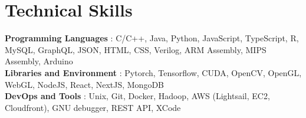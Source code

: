 \documentclass[letterpaper,11pt]{article}
\makeatletter
\newcommand{\sectionspace}{
\vspace{-20pt}
}
\newcommand{\subheadingtitlevspace}{
\vspace{-3pt}
}
\newcommand{\titleItem}[1]{
  \textbf{#1}
}
\newcommand{\resumeSubheading}[4]{
   \item
     \begin{tabular*}{0.97\textwidth}[t]{l@{\extracolsep{\fill}}r}
       \textbf{#1} | \emph{#2} & \textit{#4}\\
       \textit{#3} \\
     \end{tabular*}\vspace{-8pt}
 }
\newcommand{\resumeSubHeadingListStart}{\subheadingtitlevspace\begin{itemize}[leftmargin=0in, label={}]}
\newcommand{\resumeSubHeadingListEnd}{\end{itemize}}
\makeatother
\begin{document}
\section{Technical Skills}
\subheadingtitlevspace
  \begin{itemize}[leftmargin=0in, label={}]
    {\item{
      \titleItem{Programming Languages}{: C/C++, Java, Python, JavaScript, TypeScript, R, MySQL, GraphQL, JSON, HTML, CSS, Verilog, ARM Assembly, MIPS Assembly, Arduino} \\
      \titleItem{Libraries and Environment}{: Pytorch, Tensorflow, CUDA, OpenCV, OpenGL, WebGL, NodeJS, React, NextJS, MongoDB} \\
      \titleItem{DevOps and Tools}{: Unix, Git, Docker, Hadoop, AWS (Lightsail, EC2, Cloudfront), GNU debugger, REST API, XCode} \\
    }}
  \end{itemize}
\sectionspace



\end{document}
